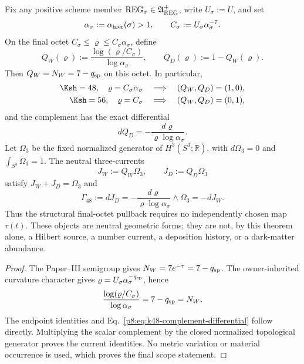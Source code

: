 \documentclass[12pt,a4paper]{article}
\begin{document}
\begin{theorem}[Scheme-uniform final-octet complement and covariant K=48 pullback]
\label{p8:thm:k48-final-octet-curvature-complement}
Fix any positive scheme member
$\mathrm{REG}_\sigma\in\mathfrak A_{\rm REG}^{+}$, write
$U_\sigma:=U$, and set
\begin{equation}
 \alpha_\sigma:=\alpha_{\rm hier}(\sigma)>1,
 \qquad
 C_\sigma:=U_\sigma\alpha_\sigma^{-7}.
\end{equation}
On the final octet
$C_\sigma\leq\varrho\leq C_\sigma\alpha_\sigma$, define
\begin{equation}
\label{p8:eq:k48-final-octet-complement}
 Q_W(\varrho)
 :=\frac{\log(\varrho/C_\sigma)}{\log\alpha_\sigma},
 \qquad
 Q_D(\varrho):=1-Q_W(\varrho).
\end{equation}
Then $Q_W=N_W=7-q_{\rm sp}$ on this octet.  In particular,
\begin{align}
 \Ksh=48,
 \quad \varrho=C_\sigma\alpha_\sigma
 &\quad\Longrightarrow\quad (Q_W,Q_D)=(1,0),\label{p8:eq:k48-complement-upper}\\
 \Ksh=56,
 \quad \varrho=C_\sigma
 &\quad\Longrightarrow\quad (Q_W,Q_D)=(0,1),\label{p8:eq:k48-complement-lower}
\end{align}
and the complement has the exact differential
\begin{equation}
\label{p8:eq:k48-complement-differential}
 dQ_D=-\frac{d\varrho}{\varrho\log\alpha_\sigma}.
\end{equation}
Let $\Omega_3$ be the fixed normalized generator of
$H^3(S^3;\mathbb R)$, with $d\Omega_3=0$ and
$\int_{S^3}\Omega_3=1$.  The neutral three-currents
\begin{equation}
\label{p8:eq:k48-neutral-three-currents}
 J_W:=Q_W\Omega_3,
 \qquad
 J_D:=Q_D\Omega_3
\end{equation}
satisfy $J_W+J_D=\Omega_3$ and
\begin{equation}
\label{p8:eq:k48-neutral-transfer-four-form}
 \Gamma_{48}:=dJ_D
 =-\frac{d\varrho}{\varrho\log\alpha_\sigma}\wedge\Omega_3
 =-dJ_W.
\end{equation}
Thus the structural final-octet pullback requires no independently chosen
map $\tau(t)$.  These objects are neutral geometric forms; they are not, by
this theorem alone, a Hilbert source, a number current, a deposition history,
or a dark-matter abundance.
\end{theorem}

\begin{proof}
The Paper--III semigroup gives
$N_W=7e^{-\tau}=7-q_{\rm sp}$.  The owner-inherited curvature character gives
$\varrho=U_\sigma\alpha_\sigma^{-q_{\rm sp}}$, hence
\begin{equation}
 \frac{\log(\varrho/C_\sigma)}{\log\alpha_\sigma}
 =7-q_{\rm sp}=N_W.
\end{equation}
The endpoint identities and
Eq.~\eqref{p8:eq:k48-complement-differential} follow directly.  Multiplying
the scalar complement by the closed normalized topological generator proves
the current identities.  No metric variation or material occurrence is used,
which proves the final scope statement.
\end{proof}
\end{document}
